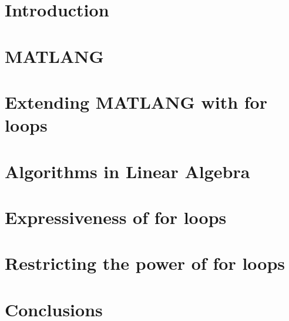 \documentclass[acmsmall]{acmart}
\begin{document}
 




\maketitle

\section{Introduction}



\section{MATLANG}\label{sec:matlang}


\section{Extending MATLANG with for loops}\label{sec:formatlang}



%

\section{Algorithms in Linear Algebra}\label{sec:queries}


\section{Expressiveness of for loops}\label{sec:circuits}



\section{Restricting the power of for loops}\label{sec:restrict}


\section{Conclusions}\label{sec:conclude}





\newpage


\end{document}
